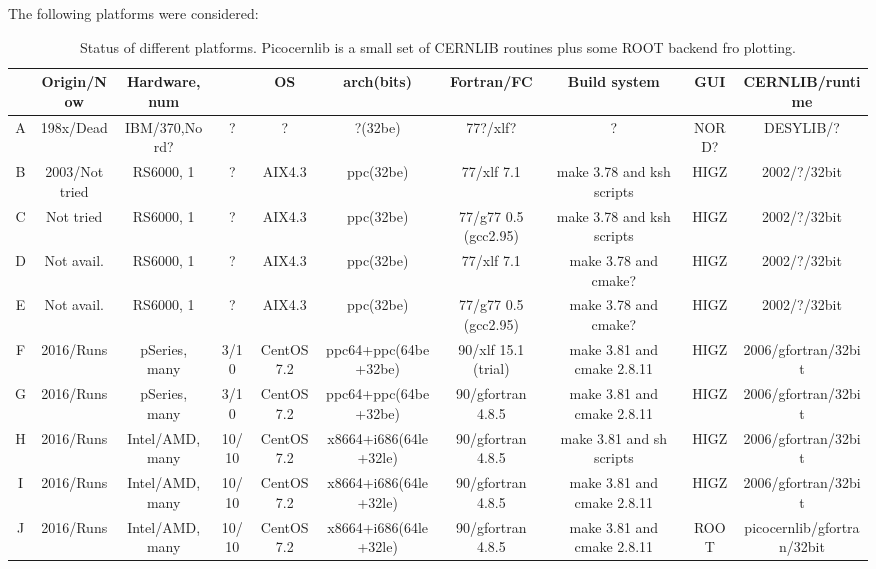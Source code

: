 The following platforms were considered:
\setlength{\tabcolsep}{0.0em}
\begin{sidewaystable}[htbp]\scriptsize\centering
\begin{tabular}{|c|c|c|c|c|c|c|c|c|c|}\hline
    & Origin/Now        & Hardware, num               &        &OS             & arch(bits)               & Fortran/FC                &Build system              &GUI      & CERNLIB/runtime  \\\hline\hline
A   & 198x/Dead         &  IBM/370,Nord?              & ?      &?              &   ?(32be)                & 77?/xlf?                  &?                         &NORD? & DESYLIB/?     \\
B   & 2003/Not tried    &  RS6000, 1                  & ?      &AIX4.3         & ppc(32be)                & 77/xlf 7.1                &make 3.78 and ksh scripts &HIGZ  & 2002/?/32bit     \\
C   &      Not tried    &  RS6000, 1                  & ?      &AIX4.3         & ppc(32be)                & 77/g77 0.5 (gcc2.95)      &make 3.78 and ksh scripts &HIGZ      & 2002/?/32bit     \\
D   &      Not avail.   &  RS6000, 1                  & ?      &AIX4.3         & ppc(32be)                & 77/xlf 7.1                &make 3.78 and cmake?      &HIGZ      & 2002/?/32bit     \\
E   &      Not avail.   &  RS6000, 1                  & ?      &AIX4.3         & ppc(32be)                & 77/g77 0.5 (gcc2.95)      &make 3.78 and cmake?      &HIGZ      & 2002/?/32bit     \\
F   & 2016/Runs         &  pSeries\@QEMU2.7, many   & 3/10   &CentOS7.2 & ppc64+ppc(64be+32be)     & 90/xlf 15.1 (trial)       &make 3.81 and cmake 2.8.11       &HIGZ      & 2006/gfortran/32bit     \\
G   & 2016/Runs         &  pSeries\@QEMU2.7, many   & 3/10   &CentOS7.2 & ppc64+ppc(64be+32be)     & 90/gfortran 4.8.5         &make 3.81 and cmake 2.8.11       &HIGZ      & 2006/gfortran/32bit     \\
H   & 2016/Runs         &  Intel/AMD, many            &10/10   &CentOS7.2 & x8664+i686(64le+32le)   & 90/gfortran 4.8.5         &make 3.81 and sh scripts        &HIGZ      & 2006/gfortran/32bit     \\
I   & 2016/Runs         &  Intel/AMD, many            &10/10   &CentOS7.2 & x8664+i686(64le+32le)   & 90/gfortran 4.8.5         &make 3.81 and cmake 2.8.11      &HIGZ      & 2006/gfortran/32bit     \\
J   & 2016/Runs         &  Intel/AMD, many            &10/10   &CentOS7.2 & x8664+i686(64le+32le)   & 90/gfortran 4.8.5         &make 3.81 and cmake 2.8.11      &ROOT      & picocernlib/gfortran/32bit     \\
\hline
\end{tabular}
\caption{Status of different platforms.  Picocernlib is a small set of CERNLIB routines plus some ROOT backend fro plotting. }
\label{tab:status}
\end{sidewaystable}



